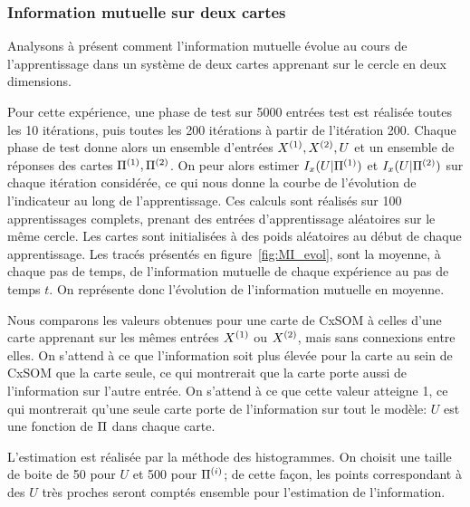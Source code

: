 
\subsubsection{Information mutuelle sur deux cartes}
Analysons à présent comment l'information mutuelle évolue au cours de l'apprentissage dans un système de deux cartes apprenant sur le cercle en deux dimensions.

Pour cette expérience, une phase de test sur 5000 entrées test est réalisée toutes les 10 itérations, puis toutes les 200 itérations à partir de l'itération 200. Chaque phase de test donne alors un ensemble d'entrées $X^{({1})}, X^{({2})}, U$ et un ensemble de réponses des cartes $\Pi^{({1})}, \Pi^{({2})}$. On peur alors estimer $I_x(U|\Pi^{({1})})$ et $I_x(U|\Pi^{({2})})$ sur chaque itération considérée, ce qui nous donne la courbe de l'évolution de l'indicateur au long de l'apprentissage. 
Ces calculs sont réalisés sur 100 apprentissages complets, prenant des entrées d'apprentissage aléatoires sur le même cercle. Les cartes sont initialisées à des poids aléatoires au début de chaque apprentissage. 
Les tracés présentés en figure~\ref{fig:MI_evol}, sont la moyenne, à chaque pas de temps, de l'information mutuelle de chaque expérience au pas de temps $t$. On représente donc l'évolution de l'information mutuelle en moyenne. 

Nous comparons les valeurs obtenues pour une carte de CxSOM à celles d'une carte apprenant sur les mêmes entrées $X^{({1})}$ ou $X^{({2})}$, mais sans connexions entre elles. On s'attend à ce que l'information soit plus élevée pour la carte au sein de CxSOM que la carte seule, ce qui montrerait que la carte porte aussi de l'information sur l'autre entrée. On s'attend à ce que cette valeur atteigne 1, ce qui montrerait qu'une seule carte porte de l'information sur tout le modèle: $U$ est une fonction de $\Pi$ dans chaque carte.

L'estimation est réalisée par la méthode des histogrammes. On choisit une taille de boite de 50 pour $U$ et 500 pour $\Pi^{({i})}$; de cette façon, les points correspondant à des $U$ très proches seront comptés ensemble pour l'estimation de l'information.


